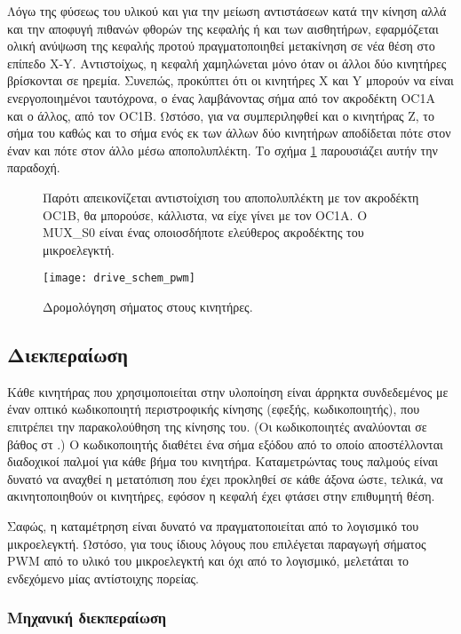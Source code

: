Λόγω της φύσεως του υλικού και για την μείωση αντιστάσεων κατά την κίνηση αλλά
και την αποφυγή πιθανών φθορών της κεφαλής ή και των αισθητήρων, εφαρμόζεται
ολική ανύψωση της κεφαλής προτού πραγματοποιηθεί μετακίνηση σε νέα θέση στο
επίπεδο X-Y. Αντιστοίχως, η κεφαλή χαμηλώνεται μόνο όταν οι άλλοι δύο κινητήρες
βρίσκονται σε ηρεμία. Συνεπώς, προκύπτει ότι οι κινητήρες X και Y μπορούν να
είναι ενεργοποιημένοι ταυτόχρονα, ο ένας λαμβάνοντας σήμα από τον ακροδέκτη OC1A
και ο άλλος, από τον OC1B. Ωστόσο, για να συμπεριληφθεί και ο κινητήρας Z, το
σήμα του καθώς και το σήμα ενός εκ των άλλων δύο κινητήρων αποδίδεται πότε στον
έναν και πότε στον άλλο μέσω αποπολυπλέκτη. Το σχήμα
\ref{fig:motor:route_pwm} παρουσιάζει αυτήν την παραδοχή.

\begin{figure}
    \caption{Δρομολόγηση σήματος στους κινητήρες.
    \label{fig:motor:route_pwm}}
Παρότι απεικονίζεται αντιστοίχιση του αποπολυπλέκτη με τον ακροδέκτη OC1B, θα
μπορούσε, κάλλιστα, να είχε γίνει με τον OC1A. Ο MUX\_S0 είναι ένας οποιοσδήποτε
ελεύθερος ακροδέκτης του μικροελεγκτή.
    \begin{center}
    \texttt{[image: drive\_schem\_pwm]}
    \end{center}
\end{figure}


\subsection{Διεκπεραίωση}
\label{subsec:motor:autoshut}

Κάθε κινητήρας που χρησιμοποιείται στην υλοποίηση είναι άρρηκτα συνδεδεμένος με
έναν οπτικό κωδικοποιητή περιστροφικής κίνησης (εφεξής, κωδικοποιητής), που
επιτρέπει την παρακολούθηση της κίνησης του. (Οι κωδικοποιητές αναλύονται σε
βάθος στ \nref.)
Ο κωδικοποιητής διαθέτει ένα σήμα εξόδου από το οποίο αποστέλλονται διαδοχικοί
παλμοί για κάθε βήμα του κινητήρα. Καταμετρώντας τους παλμούς είναι δυνατό να
αναχθεί η μετατόπιση που έχει προκληθεί σε κάθε άξονα ώστε, τελικά, να
ακινητοποιηθούν οι κινητήρες, εφόσον η κεφαλή έχει φτάσει στην επιθυμητή θέση.

Σαφώς, η καταμέτρηση είναι δυνατό να πραγματοποιείται από το λογισμικό του
μικροελεγκτή. Ωστόσο, για τους ίδιους λόγους που επιλέγεται παραγωγή σήματος PWM
από το υλικό του μικροελεγκτή και όχι από το λογισμικό, μελετάται το ενδεχόμενο
μίας αντίστοιχης πορείας.


\subsubsection{Μηχανική διεκπεραίωση}

